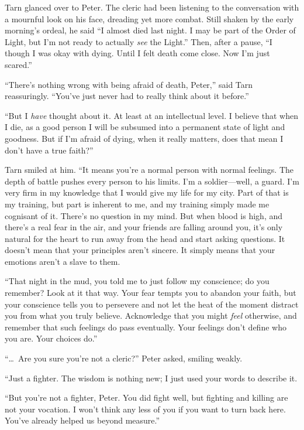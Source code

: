 Tarn glanced over to Peter.  The cleric had been listening to the conversation with a mournful look on his face, dreading yet more combat.  Still shaken by the early morning's ordeal, he said ``I almost died last night.  I may be part of the Order of Light, but I'm not ready to actually \emph{see} the Light.''  Then, after a pause, ``I though I was okay with dying.  Until I felt death come close.  Now I'm just scared.''

``There's nothing wrong with being afraid of death, Peter,'' said Tarn reassuringly.  ``You've just never had to really think about it before.''

``But I \emph{have} thought about it.  At least at an intellectual level.  I believe that when I die, as a good person I will be subsumed into a permanent state of light and goodness.  But if I'm afraid of dying, when it really matters, does that mean I don't have a true faith?''

Tarn smiled at him.  ``It means you're a normal person with normal feelings.  The depth of battle pushes every person to his limits.  I'm a soldier---well, a guard.  I'm very firm in my knowledge that I would give my life for my city.  Part of that is my training, but part is inherent to me, and my training simply made me cognisant of it.  There's no question in my mind.  But when blood is high, and there's a real fear in the air, and your friends are falling around you, it's only natural for the heart to run away from the head and start asking questions.  It doesn't mean that your principles aren't sincere.  It simply means that your emotions aren't a slave to them.

``That night in the mud, you told me to just follow my conscience; do you remember?  Look at it that way.  Your fear tempts you to abandon your faith, but your conscience tells you to persevere and not let the heat of the moment distract you from what you truly believe.  Acknowledge that you might \emph{feel} otherwise, and remember that such feelings do pass eventually.  Your feelings don't define who you are.  Your choices do.''

``\ldots\ Are you sure you're not a cleric?'' Peter asked, smiling weakly.

``Just a fighter.  The wisdom is nothing new; I just used your words to describe it.

``But you're not a fighter, Peter.  You did fight well, but fighting and killing are not your vocation.  I won't think any less of you if you want to turn back here.  You've already helped us beyond measure.''

